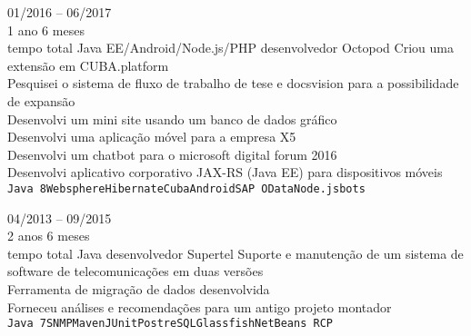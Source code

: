 \begin{entrylist}
    \entry
    {01/2016 -- 06/2017\\\footnotesize{1 ano 6 meses\\tempo total}}
    {Java EE/Android/Node.js/PHP desenvolvedor}
    {Octopod}
    {
        Criou uma extensão em CUBA.platform \\
        Pesquisei o sistema de fluxo de trabalho de tese e docsvision para a possibilidade de expansão \\
        Desenvolvi um mini site usando um banco de dados gráfico \\
        Desenvolvi uma aplicação móvel para a empresa X5 \\
        Desenvolvi um chatbot para o microsoft digital forum 2016 \\
        Desenvolvi aplicativo corporativo JAX-RS (Java EE) para dispositivos móveis\\
    \texttt{Java 8}\slashsep\texttt{Websphere}\slashsep\texttt{Hibernate}\slashsep\texttt{Cuba}\slashsep\texttt{Android}\slashsep\texttt{SAP OData}\slashsep\texttt{Node.js}\slashsep\texttt{bots}
	}
    
    \entry
    {04/2013 -- 09/2015\\\footnotesize{2 anos 6 meses\\tempo total}}
    {Java desenvolvedor}
    {Supertel}
    {
        Suporte e manutenção de um sistema de software de telecomunicações em duas versões \\
        Ferramenta de migração de dados desenvolvida \\
        Forneceu análises e recomendações para um antigo projeto montador \\
        \texttt{Java 7}\slashsep\texttt{SNMP}\slashsep\texttt{Maven}\slashsep\texttt{JUnit}\slashsep\texttt{PostreSQL}\slashsep\texttt{Glassfish}\slashsep\texttt{NetBeans RCP}
    }


\end{entrylist}
